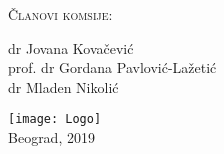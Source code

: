 \documentclass[
11pt, %
serbian,
singlespacing, %
headsepline, %
]{MastersDoctoralThesis} %
\begin{document}
\begin{titlepage}
\begin{center}
{\scshape\LARGE Članovi komsije:\par}\vspace{0.2cm} %
dr Jovana Kovačević \\
prof. dr Gordana Pavlović-Lažetić  \\
dr Mladen Nikolić \\

 
\vfill

\vspace{1cm}
\texttt{[image: Logo]}\\ %
\vspace{0.5cm}
{\large Beograd, 2019}\\ %
 
\vfill
\end{center}
\end{titlepage}



%
%  
%  
%
\end{document}
